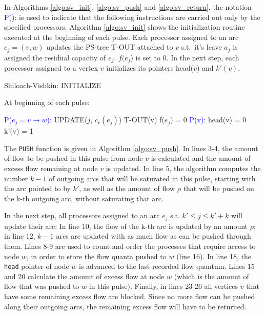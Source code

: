\documentclass[a4paper,10pt, twocolumn]{article}
\begin{document}
In Algorithms \ref{algo:sv_init}, \ref{algo:sv_push} and \ref{algo:sv_return}, the notation \textcolor{blue}{P():} is used to indicate that the following instructions are carried out only by the specified processors. Algorithm \ref{algo:sv_init} shows the initialization routine executed at the beginning of each pulse. Each processor assigned to an arc $e_j = (v, w)$ updates the PS-tree T-OUT attached to $v$ s.t.\ it's leave $a_j$ is assigned the residual capacity of $e_j$. $f(e_j$) is set to 0. In the next step, each processor assigned to a vertex $v$ initializes its pointers head($v$) and $k'(v)$.

\begin{algorithm}
\caption{Shiloach-Vishkin: INITIALIZE}
\label{algo:sv_init}
At beginning of each pulse:	
\begin{algorithmic}[1]
		\State \textcolor{blue}{P($e_j = v \rightarrow w$):}
		\State UPDATE($j$, $c_r(e_j)$) T-OUT(v)
		\State f($e_j$) = 0
		\State \textcolor{blue}{P(v):}
		\State head(v) = 0	
		\State k'(v) = 1	
 	\EndFunction
\end{algorithmic}
\end{algorithm}

The \lstinline|PUSH| function is given in Algorithm \ref{algo:sv_push}. In lines 3-4, the amount of flow to be pushed in this pulse from node $v$ is calculated and the amount of excess flow remaining at node $v$ is updated. In line 5, the algorithm computes the number $k-1$ of outgoing arcs that will be saturated in this pulse, starting with the arc pointed to by $k'$, as well as the amount of flow $\rho$ that will be pushed on the k-th outgoing arc, without saturating that arc.

In the next step, all processors assigned to an arc $e_j$ s.t. $k'\leq j \leq k'+k$ will update their arc: In line 10, the flow of the k-th arc is updated by an amount $\rho$; in line 12, $k-1$ arcs are updated with as much flow as can be pushed through them. Lines 8-9 are used to count and order the processes that require access to node $w$, in order to store the flow quanta pushed to $w$ (line 16). In line 18, the \lstinline|head| pointer of node $w$ is advanced to the last recorded flow quantum. Lines 15 and 20 calculate the amount of excess flow at node $w$ (which is the amount of flow that was pushed to $w$ in this pulse). Finally, in lines 23-26 all vertices $v$ that have some remaining excess flow are blocked. Since no more flow can be pushed along their outgoing arcs, the remaining excess flow will have to be returned.
\end{document}
